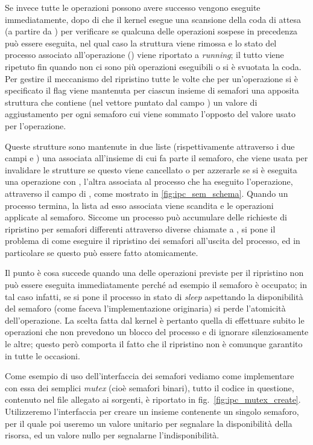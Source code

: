 Se invece tutte le operazioni possono avere successo vengono eseguite
immediatamente, dopo di che il kernel esegue una scansione della coda di
attesa (a partire da ) per verificare se qualcuna delle
operazioni sospese in precedenza può essere eseguita, nel qual caso la
struttura  viene rimossa e lo stato del processo associato
all'operazione () viene riportato a \textit{running}; il tutto
viene ripetuto fin quando non ci sono più operazioni eseguibili o si è
svuotata la coda.  Per gestire il meccanismo del ripristino tutte le volte che
per un'operazione si è specificato il flag  viene mantenuta
per ciascun insieme di semafori una apposita struttura  che
contiene (nel vettore puntato dal campo ) un valore di
aggiustamento per ogni semaforo cui viene sommato l'opposto del valore usato
per l'operazione.

Queste strutture sono mantenute in due liste (rispettivamente attraverso i due
campi  e ) una associata all'insieme di cui fa
parte il semaforo, che viene usata per invalidare le strutture se questo viene
cancellato o per azzerarle se si è eseguita una operazione con ,
l'altra associata al processo che ha eseguito l'operazione, attraverso il
campo  di , come mostrato in
\ref{fig:ipc_sem_schema}. Quando un processo termina, la lista ad esso
associata viene scandita e le operazioni applicate al semaforo.  Siccome un
processo può accumulare delle richieste di ripristino per semafori differenti
attraverso diverse chiamate a , si pone il problema di come
eseguire il ripristino dei semafori all'uscita del processo, ed in particolare
se questo può essere fatto atomicamente.

Il punto è cosa succede quando una delle operazioni previste per il ripristino
non può essere eseguita immediatamente perché ad esempio il semaforo è
occupato; in tal caso infatti, se si pone il processo in stato di
\textit{sleep} aspettando la disponibilità del semaforo (come faceva
l'implementazione originaria) si perde l'atomicità dell'operazione. La scelta
fatta dal kernel è pertanto quella di effettuare subito le operazioni che non
prevedono un blocco del processo e di ignorare silenziosamente le altre;
questo però comporta il fatto che il ripristino non è comunque garantito in
tutte le occasioni.

Come esempio di uso dell'interfaccia dei semafori vediamo come implementare
con essa dei semplici \textit{mutex} (cioè semafori binari), tutto il codice
in questione, contenuto nel file  allegato ai sorgenti, è
riportato in fig.~\ref{fig:ipc_mutex_create}. Utilizzeremo l'interfaccia per
creare un insieme contenente un singolo semaforo, per il quale poi useremo un
valore unitario per segnalare la disponibilità della risorsa, ed un valore
nullo per segnalarne l'indisponibilità. 

